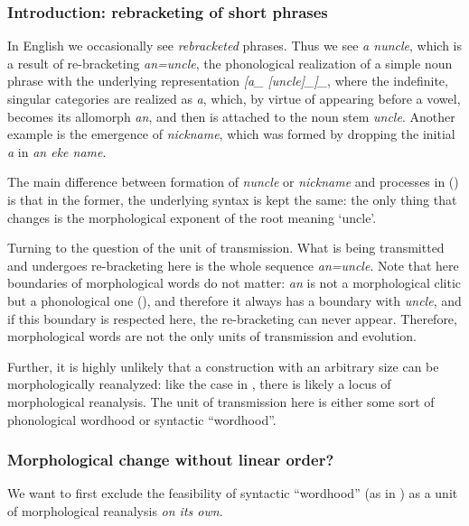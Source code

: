 \documentclass[a4paper, oneside, scheme=plain, 12pt]{article}
\newcommand{\form}[1]{\emph{#1}}
\newcommand{\translate}[1]{`#1'}
\newcommand*{\category}[1]{\textsc{#1}}
\begin{document}
\subsubsection{Introduction: rebracketing of short phrases}

In English we occasionally see \emph{rebracketed} phrases.
Thus we see \form{a nuncle}, which is a result of re-bracketing \form{an=uncle},
the phonological realization of a simple noun phrase with the underlying representation
\form{[a_{\text{\category{singular,indefinite}}} [uncle]_{\text{noun stem}}]_{\text{noun phrase}}},
where the indefinite, singular categories are realized as \form{a},
which, by virtue of appearing before a vowel, becomes its allomorph \form{an},
and then is attached to the noun stem \form{uncle}.
Another example is the emergence of \form{nickname},
which was formed by dropping the initial \form{a} in \form{an eke name}.

The main difference between formation of \form{nuncle} or \form{nickname}
and processes in ()
is that in the former, the underlying syntax is kept the same:
the only thing that changes is the morphological exponent of the root meaning \translate{uncle}.

Turning to the question of the unit of transmission.
What is being transmitted and undergoes re-bracketing here is the whole sequence \form{an=uncle}.
Note that here boundaries of morphological words do not matter:
\form{an} is not a morphological clitic but a phonological one (),
and therefore it always has a boundary with \form{uncle},
and if this boundary is respected here, the re-bracketing can never appear.
Therefore, morphological words are not the only units of transmission and evolution.

Further, it is highly unlikely that a construction with an arbitrary size can be morphologically reanalyzed:
like the case in ,
there is likely a locus of morphological reanalysis.
The unit of transmission here
is either some sort of phonological wordhood or syntactic ``wordhood''.

\subsubsection{Morphological change without linear order?}

We want to first exclude the feasibility of syntactic ``wordhood'' (as in )
as a unit of morphological reanalysis \emph{on its own}.
\end{document}
